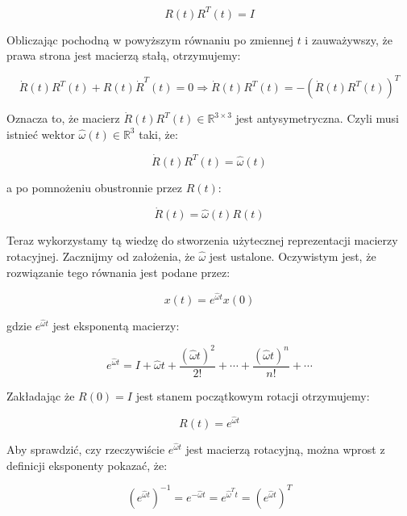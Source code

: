 \documentclass[a4paper,12pt]{article}
\newcommand{\RR}{\mathbb{R}^3}
\newcommand{\RRR}{\mathbb{R}^{3 \times 3}}
\begin{document}
\begin{equation}
R(t)R^T(t)=I
\end{equation}

Obliczając pochodną w powyższym równaniu po zmiennej $t$ i zauważywszy, że prawa strona jest macierzą stałą, otrzymujemy:

\begin{equation}
\dot{R}(t)R^T(t) + R(t)\dot{R}^T(t)=0 \Rightarrow \dot{R}(t)R^T(t)=-(\dot{R}(t)R^T(t))^T
\end{equation}

Oznacza to, że macierz $\dot{R}(t)R^T(t) \in \RRR$ jest antysymetryczna. Czyli musi istnieć wektor $\hat{\omega}(t) \in \RR$ taki, że:

\begin{equation}
\dot{R}(t)R^T(t) = \hat{\omega}(t)
\end{equation}

\noindent a po pomnożeniu obustronnie przez $R(t)$:

\begin{equation}
\dot{R}(t) = \hat{\omega}(t)R(t)
\end{equation}

Teraz wykorzystamy tą wiedzę do stworzenia użytecznej reprezentacji macierzy rotacyjnej. Zacznijmy od założenia, że $\hat{\omega}$ jest ustalone. Oczywistym jest, że rozwiązanie tego równania jest podane przez:

\begin{equation}
x(t) = e^{\hat{\omega}t}x(0)
\end{equation}

\noindent gdzie $e^{\hat{\omega}t}$ jest eksponentą macierzy:

\begin{equation}
e^{\hat{\omega}t} = I + \hat{\omega}t + \frac{(\hat{\omega}t)^2}{2!} + \cdots + \frac{(\hat{\omega}t)^n}{n!} + \cdots
\end{equation}

Zakładając że $R(0)=I$ jest stanem początkowym rotacji otrzymujemy:

\begin{equation}
R(t) = e^{\hat{\omega}t}
\end{equation}

Aby sprawdzić, czy rzeczywiście $e^{\hat{\omega}t}$ jest macierzą rotacyjną, można wprost z definicji eksponenty pokazać, że:

\begin{equation}
(e^{\hat{\omega}t})^{-1}=e^{-\hat{\omega}t}=e^{\hat{\omega}^Tt}=(e^{\hat{\omega}t})^T
\end{equation}
\end{document}

